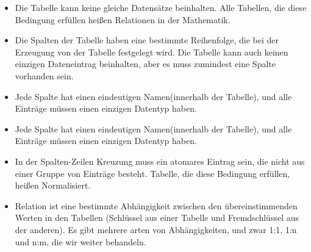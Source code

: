 \begin{itemize}
\item  Die Tabelle kann keine gleiche Datensätze beinhalten. Alle Tabellen, die diese Bedingung erfüllen heißen Relationen in der Mathematik.
\item Die Spalten der Tabelle haben eine bestimmte Reihenfolge, die bei der Erzeugung von der Tabelle festgelegt wird. Die Tabelle kann auch keinen einzigen Dateneintrag beinhalten, aber  es muss zumindest eine Spalte vorhanden sein.
\item  Jede Spalte hat einen eindeutigen Namen(innerhalb der Tabelle), und alle Einträge müssen einen einzigen Datentyp haben.
\item Jede Spalte hat einen eindeutigen Namen(innerhalb der Tabelle), und alle Einträge müssen einen einzigen Datentyp haben.
\item In der Spalten-Zeilen Kreuzung muss ein atomares Eintrag sein, die nicht aus einer Gruppe von Einträge besteht. Tabelle, die diese Bedingung erfüllen, heißen Normalisiert.
\item Relation ist eine bestimmte Abhängigkeit zwischen den übereinstimmenden Werten in den Tabellen (Schlüssel aus einer Tabelle und Fremdschlüssel aus der anderen). Es gibt mehrere arten von Abhängigkeiten, und zwar 1:1, 1:n und n:m, die wir weiter behandeln.
\end{itemize}

